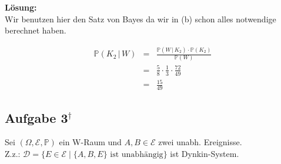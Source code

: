 \documentclass[11pt,a4paper,ngerman]{article}
\newcommand{\set}[1]{ \{ #1 \}}
\newcommand{\Prob}{\mathbb{P}}
\newcommand{\Epsilon}{\mathcal{E}}
\newcommand{\alex}{$^\dagger$}
\begin{document}
\textbf{Lösung:}\\

Wir benutzen hier den Satz von Bayes da wir in (b) schon alles notwendige berechnet haben.

\[
    \begin{array}{rcl}
        \Prob( K_2 \, | \, W) &=& \frac{\Prob(W \, | \, K_2) \cdot \Prob(K_2)}{\Prob(W)}\\
            &=& \frac{5}{8} \cdot \frac{1}{3} \cdot \frac{72}{49}\\
            &=& \frac{15}{49}
    \end{array}
\]

\subsection*{Aufgabe 3\alex}
\newcommand{\D}{\mathcal{D}}
Sei $(\Omega, \Epsilon, \Prob)$ ein W-Raum und $A,B \in \Epsilon$ zwei unabh. Ereignisse. \\
Z.z.: $\mathcal{D} = \set{E \in \Epsilon \; | \; \set{A,B, E} \text{ ist unabhängig}}$ ist Dynkin-System. \\
\end{document}
